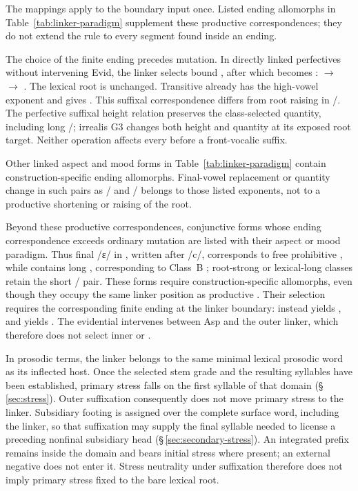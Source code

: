 The mappings apply to the boundary input once. Listed ending allomorphs in
Table~\ref{tab:linker-paradigm} supplement these productive correspondences;
they do not extend the rule to every segment found inside an ending.

The choice of the finite ending precedes mutation. In directly linked
perfectives without intervening Evid, the linker selects
bound , after which  becomes
:  $\rightarrow$ 
$\rightarrow$ . The lexical root is unchanged. Transitive
 already has the high-vowel exponent and gives
. This suffixal correspondence differs from root raising in
/. The perfective suffixal height relation
preserves the class-selected quantity, including long /;
irrealis G3 changes both height and quantity at its exposed root target.
Neither operation affects every  before a front-vocalic suffix.

Other linked aspect and mood forms in Table~\ref{tab:linker-paradigm} contain
construction-specific ending allomorphs. Final-vowel replacement or quantity
change in such pairs as / and
/ belongs to those listed exponents, not to a
productive shortening or raising of the root.

Beyond these productive correspondences, conjunctive forms whose ending
correspondence exceeds ordinary mutation are listed with their aspect or mood paradigm. Thus final /ɛ/ in
, written  after /c/, corresponds to free prohibitive , while
 contains long , corresponding to
Class~B ; root-strong or lexical-long classes retain the
short / pair. These
forms require construction-specific allomorphs, even though they occupy the same
linker position as productive . Their selection requires the
corresponding finite ending at the linker boundary: 
instead yields , and  yields
. The evidential intervenes between Asp and the outer
linker, which therefore does not select inner  or
.

In prosodic terms, the linker  belongs to the same minimal lexical
prosodic word as its inflected host. Once the selected stem grade and the resulting syllables
have been established, primary stress falls on the first syllable of that
domain (§\,\ref{sec:stress}). Outer suffixation consequently does not move
primary stress to the linker. Subsidiary footing is assigned over the complete
surface word, including the linker, so that suffixation may supply the final
syllable needed to license a preceding nonfinal subsidiary head
(§\,\ref{sec:secondary-stress}). An integrated prefix remains inside the
domain and bears initial stress where present; an external negative
 does not enter it. Stress neutrality under suffixation therefore
does not imply primary stress fixed to the bare lexical root.

